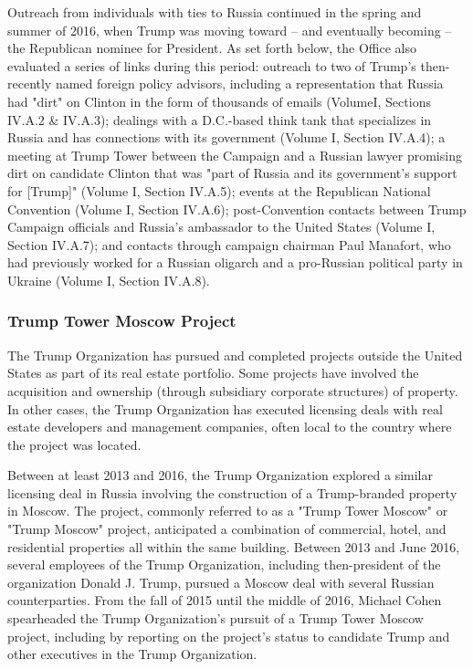 Outreach from individuals with ties to Russia continued in the spring and summer of 2016, when Trump was moving toward -- and eventually becoming -- the Republican nominee for President.
As set forth below, the Office also evaluated a series of links during this period: outreach to two of Trump's then-recently named foreign policy advisors, including a representation that Russia had "dirt" on Clinton in the form of thousands of emails (VolumeI, Sections IV.A.2 \& IV.A.3); dealings with a D.C.-based think tank that specializes in Russia and has connections with its government (Volume I, Section IV.A.4); a meeting at Trump Tower between the Campaign and a Russian lawyer promising dirt on candidate Clinton that was "part of Russia and its government's support for [Trump]" (Volume I, Section IV.A.5); events at the Republican National Convention (Volume I, Section IV.A.6); post-Convention contacts between Trump Campaign officials and Russia's ambassador to the United States (Volume I, Section IV.A.7); and contacts through campaign chairman Paul Manafort, who had previously worked for a Russian oligarch and a pro-Russian political party in Ukraine (Volume I, Section IV.A.8).

\subsubsection{Trump Tower Moscow Project}

The Trump Organization has pursued and completed projects outside the United States as part of its real estate portfolio.
Some projects have involved the acquisition and ownership (through subsidiary corporate structures) of property.
In other cases, the Trump Organization has executed licensing deals with real estate developers and management companies, often local to the country where the project was located.

Between at least 2013 and 2016, the Trump Organization explored a similar licensing deal in Russia involving the construction of a Trump-branded property in Moscow.
The project, commonly referred to as a "Trump Tower Moscow" or "Trump Moscow" project, anticipated a combination of commercial, hotel, and residential properties all within the same building.
Between 2013 and June 2016, several employees of the Trump Organization, including then-president of the organization Donald J. Trump, pursued a Moscow deal with several Russian counterparties.
From the fall of 2015 until the middle of 2016, Michael Cohen spearheaded the Trump Organization's pursuit of a Trump Tower Moscow project, including by reporting on the project's status to candidate Trump and other executives in the Trump Organization.

